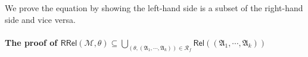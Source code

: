\documentclass[preprint,12pt]{elsarticle}
\newtheorem{lemma}[theorem]{Lemma}
\newcommand\Mm{{\mathcal{M} }}
\newcommand\conf{{\mathsf{Conf} }}
\newcommand\aname{\mathfrak{n}}
\newcommand\AutReach{\mathscr{R}}
\newcommand\RLang{\mathsf{RRel}}
\newcommand\Rel{\mathsf{Rel}}
\newcommand\Aut{{\mathfrak{A} }}
\newcommand\ConfSet{{\mathscr{C} }}
\begin{document}
We prove the equation by showing the left-hand side is a subset of the right-hand side and vice versa. 

\paragraph*{The proof of $\RLang(\Mm, \theta) \subseteq \bigcup \limits_{(\theta, (\Aut_1, \cdots, \Aut_k)) \in \AutReach_f} \Rel((\Aut_1, \cdots, \Aut_k))$}


\end{document}
